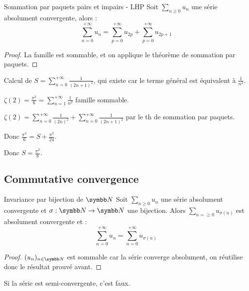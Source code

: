 \begin{proposition}{Sommation par paquets pairs et impairs - LHP}{}
    Soit $\sum_{n \geqslant 0} u_n$ une série absolument convergente, alors :
    \[\sum_{n  = 0 }^{+\infty} u_n = \sum_{p = 0 }^{+\infty} u_{2p} + \sum_{p = 0}^{+\infty} u_{2p + 1}\]
\end{proposition}

\begin{proof}
    La famille est sommable, et on applique le théorème de sommation par paquets. 
\end{proof}

\begin{exemple}
    Calcul de $\displaystyle S = \sum_{n = 0 }^{+\infty} \frac 1 {(2n + 1)^2}$, qui existe car le terme général est équivalent à $\frac 1 {n^2}$. 

    $\displaystyle \zeta(2) = \frac{\pi^2} 6 = \sum_{n = 1}^{+\infty} \frac 1 {n^2}$ famille sommable. 

    $\displaystyle \zeta(2) = \sum_{n = 0 }^{+\infty} \frac 1 {(2n)^2} + \sum_{n = 0 }^{+\infty} \frac 1 {(2n + 1)^2}$ par le th de sommation par paquets. 

    Donc $\displaystyle \frac{\pi^2} 6 = S + \frac{\pi^2}{24}$.

    Donc $S = \frac {\pi^2} 8$.
\end{exemple}

\subsection{Commutative convergence}

\begin{theoreme}{Invariance par bijection de $\N$}{}
    Soit $\displaystyle \sum_{n \geqslant 0} u_n$ une série absolument convergente et $\sigma : \N \to \N$ une bijection.
    Alors $\displaystyle \sum_{n =\geqslant 0} u_{\sigma(n)}$ est absolument convergente et :
    \[\sum_{n = 0}^{+\infty} u_n = \sum_{n = 0}^{+\infty} u_{\sigma(n)}\]
\end{theoreme}

\begin{proof}
    $(u_n)_{n \in \N}$ est sommable car la série converge absolument,
    on réutilise donc le résultat prouvé avant.
\end{proof}

\begin{remarque}
    Si la série est semi-convergente, c'est faux.
\end{remarque}

